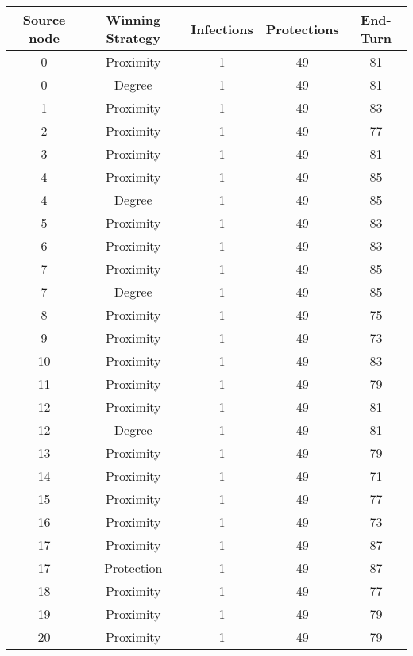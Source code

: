 \documentclass[results.tex]{subfiles}
\begin{document}
\begin{center}
  \begin{tabular}{| c || c | c | c | c |}
    \hline
    {\bfseries Source node} & {\bfseries Winning Strategy} & {\bfseries Infections} & {\bfseries Protections} & {\bfseries End-Turn} \\  %
    \hline\hline
    0 & Proximity & 1 & 49 & 81 \\ 
    \hline
    0 & Degree & 1 & 49 & 81 \\ 
    \hline
    1 & Proximity & 1 & 49 & 83 \\ 
    \hline
    2 & Proximity & 1 & 49 & 77 \\ 
    \hline
    3 & Proximity & 1 & 49 & 81 \\ 
    \hline
    4 & Proximity & 1 & 49 & 85 \\ 
    \hline
    4 & Degree & 1 & 49 & 85 \\ 
    \hline
    5 & Proximity & 1 & 49 & 83 \\ 
    \hline
    6 & Proximity & 1 & 49 & 83 \\ 
    \hline
    7 & Proximity & 1 & 49 & 85 \\ 
    \hline
    7 & Degree & 1 & 49 & 85 \\ 
    \hline
    8 & Proximity & 1 & 49 & 75 \\ 
    \hline
    9 & Proximity & 1 & 49 & 73 \\ 
    \hline
    10 & Proximity & 1 & 49 & 83 \\ 
    \hline
    11 & Proximity & 1 & 49 & 79 \\ 
    \hline
    12 & Proximity & 1 & 49 & 81 \\ 
    \hline
    12 & Degree & 1 & 49 & 81 \\ 
    \hline
    13 & Proximity & 1 & 49 & 79 \\ 
    \hline
    14 & Proximity & 1 & 49 & 71 \\ 
    \hline
    15 & Proximity & 1 & 49 & 77 \\ 
    \hline
    16 & Proximity & 1 & 49 & 73 \\ 
    \hline
    17 & Proximity & 1 & 49 & 87 \\ 
    \hline
    17 & Protection & 1 & 49 & 87 \\ 
    \hline
    18 & Proximity & 1 & 49 & 77 \\ 
    \hline
    19 & Proximity & 1 & 49 & 79 \\ 
    \hline
    20 & Proximity & 1 & 49 & 79 \\ 

\end{tabular}
\end{center}
\end{document}
